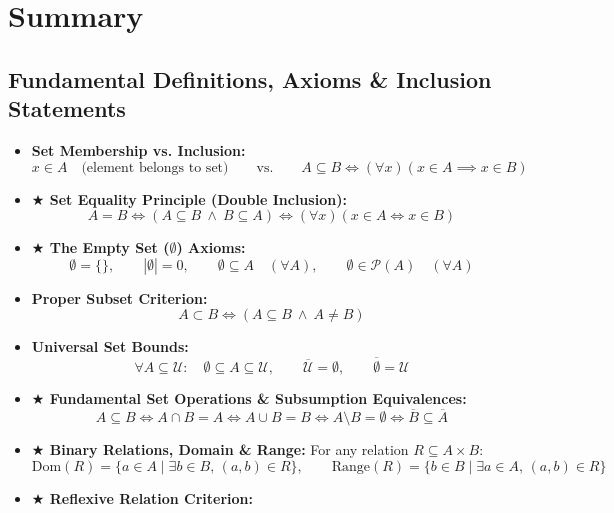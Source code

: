 \documentclass[11pt,a4paper]{article}
\begin{document}
\newpage
\section{Summary}

\subsection{Fundamental Definitions, Axioms \& Inclusion Statements}
\begin{defbox}
\begin{itemize}
    \item \textbf{Set Membership vs. Inclusion:}
    \[
    x \in A \quad \text{(element belongs to set)} \qquad \text{vs.} \qquad A \subseteq B \iff (\forall x)(x \in A \implies x \in B)
    \]
    \item \textbf{\color{gold!90!black}$\bigstar$ Set Equality Principle (Double Inclusion):}
    \[
    A = B \iff (A \subseteq B \ \land \ B \subseteq A) \iff (\forall x)(x \in A \iff x \in B)
    \]
    \item \textbf{\color{gold!90!black}$\bigstar$ The Empty Set ($\emptyset$) Axioms:}
    \[
    \emptyset = \{\}, \qquad |\emptyset| = 0, \qquad \emptyset \subseteq A \quad (\forall A), \qquad \emptyset \in \mathcal{P}(A) \quad (\forall A)
    \]
    \item \textbf{Proper Subset Criterion:}
    \[
    A \subset B \iff (A \subseteq B \ \land \ A \neq B)
    \]
    \item \textbf{Universal Set Bounds:}
    \[
    \forall A \subseteq \mathcal{U}: \quad \emptyset \subseteq A \subseteq \mathcal{U}, \qquad \overline{\mathcal{U}} = \emptyset, \qquad \overline{\emptyset} = \mathcal{U}
    \]
    \item \textbf{\color{gold!90!black}$\bigstar$ Fundamental Set Operations \& Subsumption Equivalences:}
    \[
    A \subseteq B \iff A \cap B = A \iff A \cup B = B \iff A \setminus B = \emptyset \iff \overline{B} \subseteq \overline{A}
    \]
    \item \textbf{\color{gold!90!black}$\bigstar$ Binary Relations, Domain \& Range:} For any relation $R \subseteq A \times B$:
    \[
    \text{Dom}(R) = \{a \in A \mid \exists b \in B, \, (a, b) \in R\}, \qquad \text{Range}(R) = \{b \in B \mid \exists a \in A, \, (a, b) \in R\}
    \]
    \item \textbf{\color{gold!90!black}$\bigstar$ Reflexive Relation Criterion:}

\end{itemize}
\end{defbox}
\end{document}
